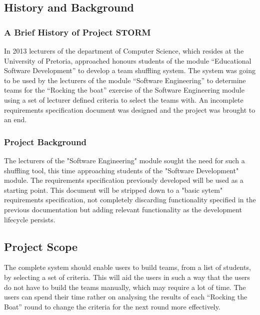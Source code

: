 \subsection{History and Background}
\subsubsection{A Brief History of Project STORM}
In 2013 lecturers of the department of Computer Science, which resides at the University of Pretoria,
approached honours students of the module “Educational Software Development” to develop a team
shuffling system. 
The system was going to be used by the lecturers of the module “Software Engineering” to
determine teams for the “Rocking the boat” exercise of the Software Engineering module using a
set of lecturer ­defined criteria to select the teams with. An incomplete requirements specification document
was designed and the project was brought to an end. 

\subsubsection{Project Background}
The lecturers of the "Software Engineering" module sought the need for such a shuffling tool, this
time approaching students of the "Software Development" module. The requirements specification previously 
developed will be used as a starting point. This document will be stripped down to a "basic sytem" requirements
specification, not completely discarding functionality specified in the previous documentation but adding relevant functionality
as the development lifecycle persists.

\subsection{Project Scope}
The complete system should enable users to build teams, from a list of students, by selecting a
set of criteria. This will aid the users in such a way that the users do not have to build the teams
manually, which may require a lot of time. The users can spend their time rather on analysing
the results of each “Rocking the Boat” round to change the criteria for the next round more
effectively.
